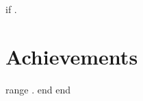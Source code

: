{{if .}}
\section{Achievements}
    \resumeSubHeadingListStart
     \vspace{-5pt}
        \resumeItemListStart
        {{range .}}
        {{end}}
        \resumeItemListEnd
    \resumeSubHeadingListEnd
{{end}}